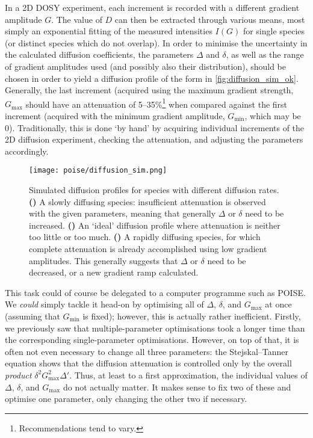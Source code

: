 In a 2D DOSY experiment, each increment is recorded with a different gradient amplitude $G$.
The value of $D$ can then be extracted through various means, most simply an exponential fitting of the measured intensities $I(G)$ for single species (or distinct species which do not overlap).
In order to minimise the uncertainty in the calculated diffusion coefficients, the parameters $\Delta$ and $\delta$, as well as the range of gradient amplitudes used (and possibly also their distribution), should be chosen in order to yield a diffusion profile of the form in \cref{fig:diffusion_sim_ok}.
Generally, the last increment (acquired using the maximum gradient strength, $G_\text{max}$ should have an attenuation of 5--35\%\footnote{Recommendations tend to vary.} when compared against the first increment (acquired with the minimum gradient amplitude, $G_\text{min}$, which may be 0).
Traditionally, this is done `by hand' by acquiring individual increments of the 2D diffusion experiment, checking the attenuation, and adjusting the parameters accordingly.\autocite{Johnson1999PNMRS,Claridge2016}

\begin{figure}[htb]
    \centering
    \texttt{[image: poise/diffusion\_sim.png]}%
    {\label{fig:diffusion_sim_weak}}%
    {\label{fig:diffusion_sim_ok}}%
    {\label{fig:diffusion_sim_strong}}%
    \caption[Simulated diffusion profiles for slow, intermediate, and rapid diffusion]{
        Simulated diffusion profiles for species with different diffusion rates.
        \textbf{()} A slowly diffusing species: insufficient attenuation is observed with the given parameters, meaning that generally $\Delta$ or $\delta$ need to be increased.
        \textbf{()} An `ideal' diffusion profile where attenuation is neither too little or too much.
        \textbf{()} A rapidly diffusing species, for which complete attenuation is already accomplished using low gradient amplitudes. This generally suggests that $\Delta$ or $\delta$ need to be decreased, or a new gradient ramp calculated.
    }
    \label{fig:diffusion_sim}
\end{figure}

This task could of course be delegated to a computer programme such as POISE.
We \textit{could} simply tackle it head-on by optimising all of $\Delta$, $\delta$, and $G_\text{max}$ at once (assuming that $G_\text{min}$ is fixed); however, this is actually rather inefficient.
Firstly, we previously saw that multiple-parameter optimisations took a longer time than the corresponding single-parameter optimisations.
However, on top of that, it is often not even necessary to change all three parameters: the Stejskal--Tanner equation shows that the diffusion attenuation is controlled only by the overall \textit{product} $\delta^2 G_\text{max}^2 \Delta'$.
Thus, at least to a first approximation, the individual values of $\Delta$, $\delta$, and $G_\text{max}$ do not actually matter.
It makes sense to fix two of these and optimise one parameter, only changing the other two if necessary.

